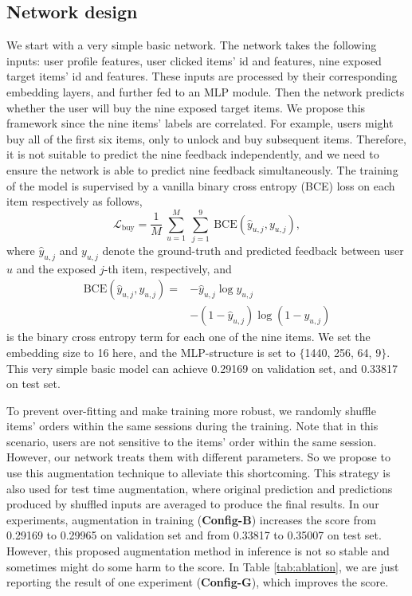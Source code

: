\subsection{Network design}

We start with a very simple basic network.
The network takes the following inputs: user profile features, user clicked items' id and features, nine exposed target items' id and features.
%
These inputs are processed by their corresponding embedding layers, and further fed to an MLP module.
%
Then the network predicts whether the user will buy the nine exposed target items.
%
We propose this framework since the nine items' labels are correlated. For example, users might buy all of the first six items, only to unlock and buy subsequent items. Therefore, it is not suitable to predict the nine feedback independently, and we need to ensure the network is able to predict nine feedback simultaneously.
%
The training of the model is supervised by a vanilla binary cross entropy (BCE) loss on each item respectively as follows,
\begin{equation}
    \mathcal{L}_{\text{buy}} = \frac{1}{M} ~\overset{M}{\underset{u=1}{\sum}}
    ~\overset{9}{\underset{j=1}{\sum}} 
        ~\text{BCE}(\hat{y}_{u,j}, y_{u,j}),
\end{equation}
where $\hat{y}_{u,j}$ and $ y_{u,j}$ denote the ground-truth and predicted feedback between user $u$ and the exposed $j$-th item, respectively, and
\begin{equation}
\begin{aligned}
    \text{BCE}(\hat{y}_{u,j}, y_{u,j}) = 
        &- \hat{y}_{u,j} \log y_{u,j} \\
        &- (1-\hat{y}_{u,j}) \log (1-y_{u,j})
\end{aligned}
\end{equation}
is the binary cross entropy term for each one of the nine items.
We set the embedding size to 16 here, and the MLP-structure is set to $\{$1440, 256, 64, 9$\}$. This very simple basic model can achieve 0.29169 on validation set, and 0.33817 on test set.


To prevent over-fitting and make training more robust, we randomly shuffle items' orders within the same sessions during the training. 
Note that in this scenario, users are not sensitive to the items' order within the same session. However, our network treats them with different parameters. So we propose to use this augmentation technique to alleviate this shortcoming.
This strategy is also used for test time augmentation, where original prediction and predictions produced by shuffled inputs are averaged to produce the final results.
In our experiments, augmentation in training (\textbf{Config-B}) increases the score from 0.29169 to 0.29965 on validation set and from 0.33817 to 0.35007 on test set.
However, this proposed augmentation method in inference is not so stable and sometimes might do some harm to the score.
In Table \ref{tab:ablation}, we are just reporting the result of one experiment (\textbf{Config-G}), which improves the score.


